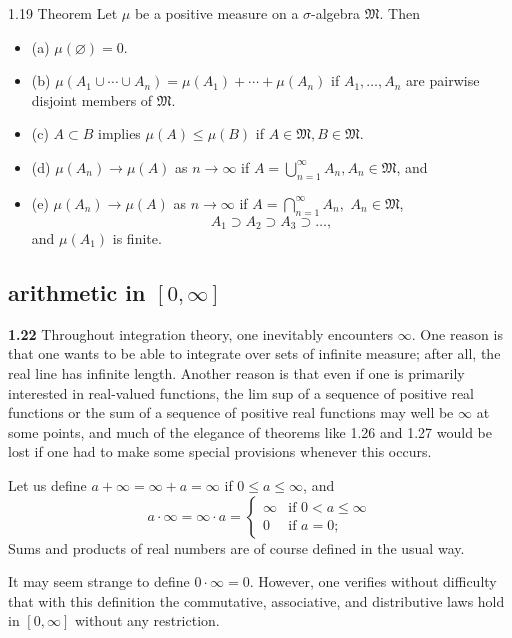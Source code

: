 \documentclass[11pt]{article}
\begin{document}
\label{orga5a3b1d}
1.19 Theorem Let \(\mu\) be a positive measure on a \(\sigma\)-algebra \(\mathfrak{M}\). Then

\begin{itemize}
\item (a) \(\mu(\varnothing)=0\).
\item (b) \(\mu\left(A_1 \cup \cdots \cup A_n\right)=\mu\left(A_1\right)+\cdots+\mu\left(A_n\right)\) if \(A_1, \ldots, A_n\) are pairwise disjoint members of \(\mathfrak{M}\).
\item (c) \(A \subset B\) implies \(\mu(A) \leq \mu(B)\) if \(A \in \mathfrak{M}, B \in \mathfrak{M}\).
\item (d) \(\mu\left(A_n\right) \rightarrow \mu(A)\) as \(n \rightarrow \infty\) if \(A=\bigcup_{n=1}^{\infty} A_n, A_n \in \mathfrak{M}\), and
\item (e) \(\mu(A_{n}) \to \mu (A)\) as \(n \to \infty\) if \(A = \bigcap _{n=1}^{\infty} A_{n},\) \(A_{n}\in \mathfrak{M}\),
\[A_1 \supset A_{2} \supset A_{3} \supset \dots,\]
and \(\mu(A_1)\) is finite.
\end{itemize}
\subsection{arithmetic in \([0, \infty]\)}
\label{sec:org07e176e}

\label{org78163a9}
\textbf{1.22} Throughout integration theory, one inevitably encounters \(\infty\). One reason is that one wants to be able to integrate over sets of infinite measure; after all, the real line has infinite length. Another reason is that even if one is primarily interested in real-valued functions, the lim sup of a sequence of positive real functions or the sum of a sequence of positive real functions may well be \(\infty\) at some points, and much of the elegance of theorems like 1.26 and 1.27 would be lost if one had to make some special provisions whenever this occurs.

Let us define \(a + \infty = \infty + a = \infty\) if \(0 \leq a \leq \infty\), and
\[ a \cdot \infty = \infty \cdot a = \begin{cases}
\infty & \text{if } 0 < a \leq \infty \\
0 & \text{if } a = 0;
\end{cases} \]
Sums and products of real numbers are of course defined in the usual way.

It may seem strange to define \(0 \cdot \infty = 0\). However, one verifies without difficulty that with this definition the commutative, associative, and distributive laws hold in \([0, \infty]\) without any restriction.
\end{document}
